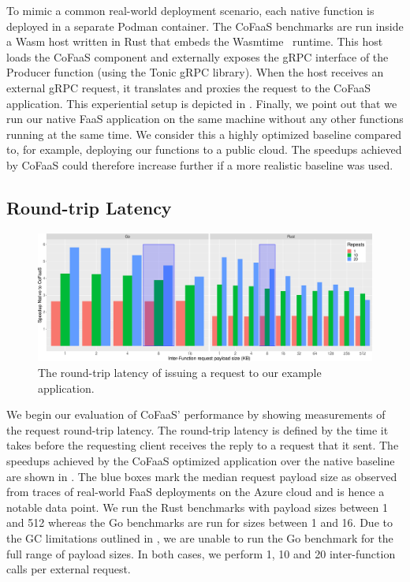 To mimic a common real-world deployment scenario, each native function is deployed in a separate Podman container. The CoFaaS benchmarks are run inside a Wasm host written in Rust that embeds the Wasmtime~\cite{wasmtime} runtime. This host loads the CoFaaS component and externally exposes the gRPC interface of the Producer function (using the Tonic gRPC library). When the host receives an external gRPC request, it translates and proxies the request to the CoFaaS application. This experiential setup is depicted in .
Finally, we point out that we run our native FaaS application on the same machine without any other functions running at the same time. We consider this a highly optimized baseline compared to, for example, deploying our functions to a public cloud. The speedups achieved by CoFaaS could therefore increase further if a more realistic baseline was used.



\subsection{Round-trip Latency}
\label{es:subsec:rtt}

\begin{figure}
  \centering
  \includegraphics[width=\textwidth]{figures/rust-go}
  \caption{\label{es:fig:rtt-latency} The round-trip latency of issuing a request to our example application.}
\end{figure}

We begin our evaluation of CoFaaS' performance by showing measurements of the request round-trip latency. The round-trip latency is defined by the time it takes before the requesting client receives the reply to a request that it sent. The speedups achieved by the CoFaaS optimized application over the native baseline are shown in . The blue boxes mark the median request payload size as observed from traces of real-world FaaS deployments on the Azure cloud \cite{mahgoub22_wisef} and is hence a notable data point. We run the Rust benchmarks with payload sizes between 1 and 512 whereas the Go benchmarks are run for sizes between 1 and 16. Due to the GC limitations outlined in , we are unable to run the Go benchmark for the full range of payload sizes. In both cases, we perform 1, 10 and 20 inter-function calls per external request.

